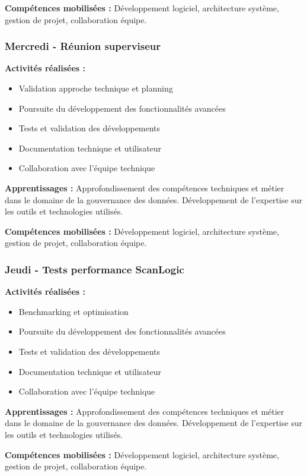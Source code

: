 \textbf{Compétences mobilisées :}
Développement logiciel, architecture système, gestion de projet, collaboration équipe.

\subsubsection{Mercredi - Réunion superviseur}

\textbf{Activités réalisées :}
\begin{itemize}
    \item Validation approche technique et planning
    \item Poursuite du développement des fonctionnalités avancées
    \item Tests et validation des développements
    \item Documentation technique et utilisateur
    \item Collaboration avec l'équipe technique
\end{itemize}

\textbf{Apprentissages :}
Approfondissement des compétences techniques et métier dans le domaine de la gouvernance des données. Développement de l'expertise sur les outils et technologies utilisés.

\textbf{Compétences mobilisées :}
Développement logiciel, architecture système, gestion de projet, collaboration équipe.

\subsubsection{Jeudi - Tests performance ScanLogic}

\textbf{Activités réalisées :}
\begin{itemize}
    \item Benchmarking et optimisation
    \item Poursuite du développement des fonctionnalités avancées
    \item Tests et validation des développements
    \item Documentation technique et utilisateur
    \item Collaboration avec l'équipe technique
\end{itemize}

\textbf{Apprentissages :}
Approfondissement des compétences techniques et métier dans le domaine de la gouvernance des données. Développement de l'expertise sur les outils et technologies utilisés.

\textbf{Compétences mobilisées :}
Développement logiciel, architecture système, gestion de projet, collaboration équipe.

